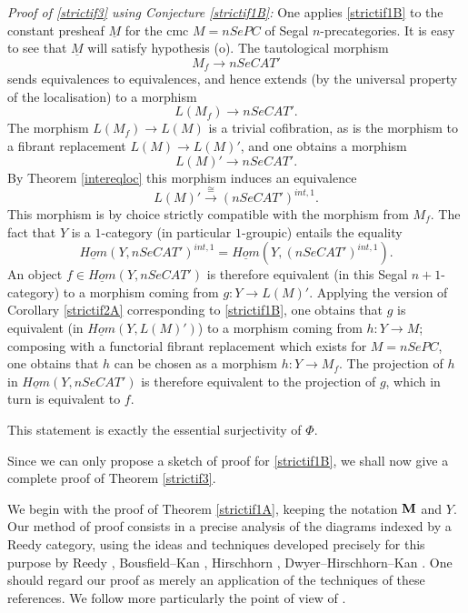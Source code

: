 {\em Proof of \ref{strictif3} using Conjecture
\ref{strictif1B}:}
One applies \ref{strictif1B} to the constant presheaf $\underline{M}$ for
the cmc
$M=nSePC$ of Segal $n$-precategories. It is easy to see that
$\underline{M}$ will satisfy
hypothesis (o). The tautological morphism
$$
M_f \rightarrow nSeCAT'
$$
sends equivalences to
equivalences, and hence extends (by the universal
property of the localisation) to a morphism
$$
L(M_f) \rightarrow nSeCAT'.
$$
The morphism $L(M_f)\rightarrow L(M)$ is a trivial cofibration,
as is the morphism to a fibrant replacement
$L(M)\rightarrow L(M)'$, and one obtains a
morphism
$$
L(M)' \rightarrow nSeCAT'.
$$
By Theorem \ref{intereqloc} this
morphism induces an equivalence
$$
L(M)' \stackrel{\cong}{\rightarrow} (nSeCAT')^{int, 1}.
$$
This morphism is by choice strictly compatible with the morphism from
$M_f$. The fact that $Y$ is a $1$-category (in particular
$1$-groupic) entails the equality
$$
\underline{Hom}(Y, nSeCAT')^{int, 1} =
\underline{Hom}(Y, (nSeCAT')^{int, 1}).
$$
An object $f\in \underline{Hom}(Y, nSeCAT')$ is therefore equivalent (in this
Segal $n+1$-category) to a morphism coming from
$g: Y\rightarrow L(M)'$. Applying the version of Corollary
\ref{strictif2A}
corresponding to \ref{strictif1B}, one obtains that $g$ is
equivalent (in $\underline{Hom}(Y, L(M)')$) to a morphism coming from
$h: Y\rightarrow M$; composing with a functorial fibrant replacement which
exists for $M=nSePC$, one obtains that $h$ can be chosen as a
morphism $h:
Y\rightarrow M_f$. The projection of $h$ in $\underline{Hom}(Y, nSeCAT')$ is
therefore equivalent to the projection of $g$, which in turn is equivalent
to $f$.

This statement is exactly the essential surjectivity of $\Phi$.
\eop

Since we can only propose a sketch of proof for \ref{strictif1B}, we shall
now give a complete proof of Theorem \ref{strictif3}.




We begin with the proof of Theorem \ref{strictif1A},
keeping the notation ${\bf M}$ and $Y$. Our method of proof
consists in
a precise analysis of the diagrams indexed by a Reedy category,
using the ideas and techniques developed precisely
for this purpose by Reedy
\cite{Reedy}, Bousfield--Kan \cite{BousfieldKan}, Hirschhorn \cite{Hirschhorn},
Dwyer--Hirschhorn--Kan \cite{DHK}. One should regard our proof
as merely an application of the techniques of these references. We follow
more particularly the point of view of \cite{Hirschhorn}.

